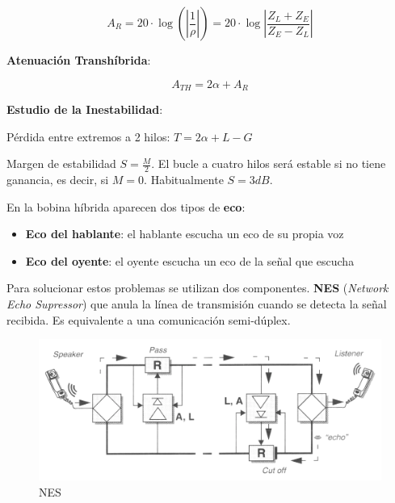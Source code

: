 \documentclass[10pt,portrait, twocolumn]{article}
\begin{document}
	\begin{equation*}
		A_{R} =  20 \cdot \log \left( \left| \frac{1}{\rho} \right| \right) = 20 \cdot \log \left| \frac{Z_{L} + Z_{E}}{Z_{E} - Z_{L}} \right|
	\end{equation*}

\textbf{Atenuación Transhíbrida}:

	\begin{equation*}
		A_{TH} = 2 \alpha + A_{R}
	\end{equation*}
	
\textbf{Estudio de la Inestabilidad}:	
	
Pérdida entre extremos a 2 hilos: $T = 2 \alpha + L - G$

Margen de estabilidad $S = \frac{M}{2}$. El bucle a cuatro hilos será estable si no tiene ganancia, es decir, si $M = 0$. Habitualmente $S = 3 dB$.	
	
En la bobina híbrida aparecen dos tipos de \textbf{eco}:

	\begin{itemize}
		\item \textbf{Eco del hablante}: el hablante escucha un eco de su propia voz
		\item \textbf{Eco del oyente}: el oyente escucha un eco de la señal que escucha
	\end{itemize}
	
Para solucionar estos problemas se utilizan dos componentes. \textbf{NES} (\textit{Network Echo Supressor}) que anula la línea de transmisión cuando se detecta la señal recibida. Es equivalente a una comunicación semi-dúplex.
	

	\begin{figure}[!ht]
 		\centering
  		 \includegraphics[scale = 0.25]{images/NES}
		\caption{NES}
	\end{figure}
	
\end{document}
